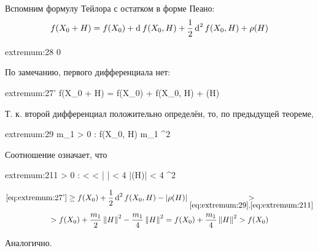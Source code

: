 \begin{eproof}
	\item Вспомним формулу Тейлора с остатком в форме Пеано:
	$$ f(X_0 + H) = f(X_0) + \di f(X_0, H) + \half \di[2] f(X_0, H) + \rho(H) $$
	\begin{equ}{extremum:28}
		   0
	\end{equ}
	По замечанию, первого дифференциала нет:
	\begin{equ}{extremum:27'}
		f(X_0 + H) = f(X_0) + \half \di[2] f(X_0, H) + \rho(H)
	\end{equ}
	Т. к. второй дифференциал положительно определён, то, по предыдущей теореме,
	\begin{equ}{extremum:29}
		\exist m_1 > 0 : \di[2] f(X_0, H) \ge m_1 ^2
	\end{equ}
	Соотношение  означает, что
	\begin{equ}{extremum:211}
		\exist \delta > 0 :  <  < \delta \quad \bigg|  \bigg| < 4 \qquad \iff |\rho(H)| < 4 ^2
	\end{equ}
	\begin{multline*}
		\eref{extremum:27'} \ge f(X_0) + \half \di[2] f(X_0, H) - |\rho(H)| \underset{\eref{extremum:29}, \eref{extremum:211}}> \\
		> f(X_0) + \half[m_1]\norm{H}^2 - \frac{m_1}4\norm{H}^2 = f(X_0) + \frac{m_1}4\norm{H}^2 > f(X_0)
	\end{multline*}

	\item Аналогично.


\end{eproof}
